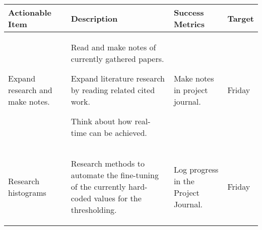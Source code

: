 \begin{table}[!h]
    \centering
    \begin{tabularx}{\textwidth}{|X|X|X|l|}
        \hline
        Actionable Item & Description & Success Metrics & Target \\
        \hline
        \hline
        Expand research and make notes. &
        \begin{myitemize}
            \item Read and make notes of currently gathered papers.
            \item Expand literature research by reading related cited work.
            \item Think about how real-time can be achieved.
        \end{myitemize} &
        \begin{myitemize}
            \item Make notes in project journal.
        \end{myitemize} &
        Friday \\
        \hline
        Research histograms &
        \begin{myitemize}
            \item Research methods to automate the fine-tuning of the currently hard-coded values for the thresholding.
        \end{myitemize} &
        \begin{myitemize}
            \item Log progress in the Project Journal.
        \end{myitemize} &
        Friday \\
        \hline
    \end{tabularx}
\end{table}
